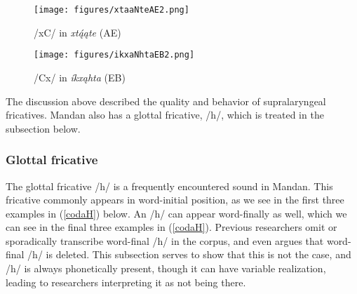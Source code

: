 \begin{figure}

\caption{/xC/ in \textit{xtą́ąte} (AE)}\label{CXcluster}
\texttt{[image: figures/xtaaNteAE2.png]}
\end{figure}

\begin{figure}
\caption{/Cx/ in \textit{íkxąhta} (EB)}\label{XCcluster}
\texttt{[image: figures/ikxaNhtaEB2.png]}

\end{figure}

The discussion above described the quality and behavior of supralaryngeal fricatives. Mandan also has a glottal fricative, /h/, which is treated in the subsection below.

\subsubsection{Glottal fricative}\label{glottalfric}

The glottal fricative /h/ is a frequently encountered sound in Mandan. This fricative commonly appears in word-initial position, as we see in the first three examples in (\ref{codaH}) below. An /h/ can appear word-finally as well, which we can see in the final three examples in (\ref{codaH}). Previous researchers omit or sporadically transcribe word-final /h/ in the corpus, and \citet[43]{hollow1970} even argues that word-final /h/ is deleted. This subsection serves to show that this is not the case, and /h/ is always phonetically present, though it can have variable realization, leading to researchers interpreting it as not being there.

